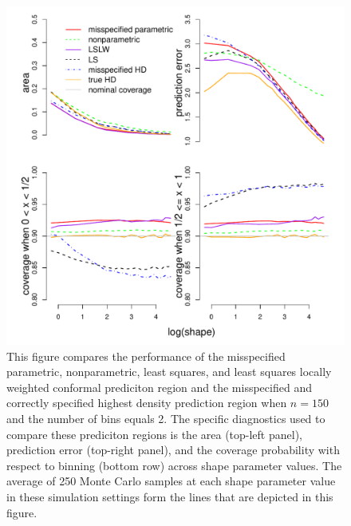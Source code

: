 \documentclass[11pt]{article}\usepackage[]{graphicx}\usepackage[]{color}
\makeatletter
\def\maxwidth{ %
  \ifdim\Gin@nat@width>\linewidth
    \linewidth
  \else
    \Gin@nat@width
  \fi
}
\newenvironment{knitrout}{}{} %
\makeatother
\begin{document}
\newpage
\begin{figure}[h!]
\begin{center}
\begin{knitrout}
\color{fgcolor}
\includegraphics[width=\maxwidth]{figure/Fig-misspec-150-1} 

\end{knitrout}
\end{center}
\caption{This figure compares the performance of the 
  misspecified parametric,
  nonparametric,
  least squares, and 
  least squares locally weighted conformal prediciton region and the 
  misspecified and correctly specified highest density prediction region 
  when $n = 150$ and the number of bins equals 2.  
  The specific diagnostics used to compare these prediciton regions is the 
    area (top-left panel),
    prediction error (top-right panel), and
    the coverage probability with respect to binning (bottom row) 
    across shape parameter values.
  The average of 250 Monte Carlo samples at each shape parameter value in 
  these simulation settings form the lines that are depicted in this figure.}
\label{Fig:misspec.150}
\end{figure}
\end{document}
